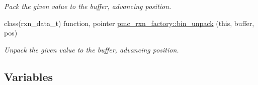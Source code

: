 \begin{DoxyCompactItemize}
\begin{DoxyCompactList}\small\item\em Pack the given value to the buffer, advancing position. \end{DoxyCompactList}\item 
class(rxn\+\_\+data\+\_\+t) function, pointer \mbox{\hyperlink{namespacepmc__rxn__factory_a35c01465a02ea6217cf674e06b17fd2f}{pmc\+\_\+rxn\+\_\+factory\+::bin\+\_\+unpack}} (this, buffer, pos)
\begin{DoxyCompactList}\small\item\em Unpack the given value to the buffer, advancing position. \end{DoxyCompactList}\end{DoxyCompactItemize}
\subsection*{Variables}

